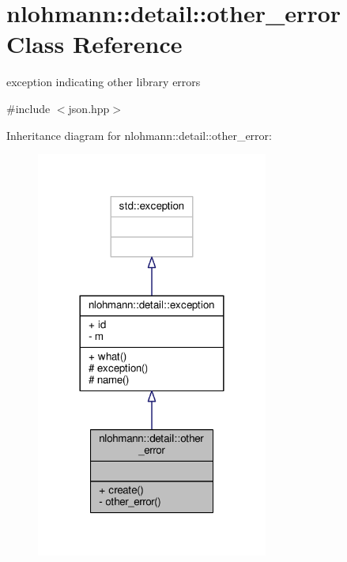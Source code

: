 \hypertarget{classnlohmann_1_1detail_1_1other__error}{}\section{nlohmann\+:\+:detail\+:\+:other\+\_\+error Class Reference}
\label{classnlohmann_1_1detail_1_1other__error}


exception indicating other library errors  




{\ttfamily \#include $<$json.\+hpp$>$}



Inheritance diagram for nlohmann\+:\+:detail\+:\+:other\+\_\+error\+:
\nopagebreak
\begin{figure}[H]
\begin{center}
\leavevmode
\includegraphics[width=216pt]{classnlohmann_1_1detail_1_1other__error__inherit__graph}
\end{center}
\end{figure}


